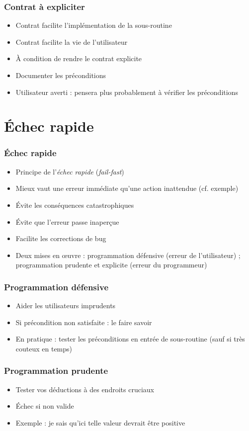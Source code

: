 \documentclass[english, french]{beamer}
\begin{document}
\begin{frame}
	\frametitle{Contrat à expliciter}
	\begin{itemize}
		\item Contrat facilite l’implémentation de la sous-routine
		\item Contrat facilite la vie de l’utilisateur
		\item À condition de rendre le contrat explicite
		\item Documenter les préconditions
		\item Utilisateur averti : pensera plus probablement à vérifier les préconditions
	\end{itemize}
\end{frame}

\section{Échec rapide}
\begin{frame}
	\frametitle{Échec rapide}
	\begin{itemize}
		\item Principe de l’\emph{échec rapide} (\emph{fail-fast})
		\item Mieux vaut une erreur immédiate qu’une action inattendue (cf. exemple)
		\item Évite les conséquences catastrophiques
		\item Évite que l’erreur passe inaperçue
		\item Facilite les corrections de bug
		\item Deux mises en œuvre : programmation défensive (erreur de l’utilisateur) ; programmation prudente et explicite (erreur du programmeur)
	\end{itemize}
\end{frame}

\begin{frame}
	\frametitle{Programmation défensive}
	\begin{itemize}
		\item Aider les utilisateurs imprudents
		\item Si précondition non satisfaite : le faire savoir
		\item En pratique : tester les préconditions en entrée de sous-routine {\tiny (sauf si très couteux en temps)}
	\end{itemize}
\end{frame}

\begin{frame}
	\frametitle{Programmation prudente}
	\begin{itemize}
		\item Tester vos déductions à des endroits cruciaux 
		\item Échec si non valide
		\item Exemple : je sais qu’ici telle valeur devrait être positive
	\end{itemize}
\end{frame}
\end{document}
